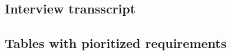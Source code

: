 \documentclass[paper=a4, fontsize=11pt,twoside]{scrartcl}	%
\begin{document}
\subsection{Interview transscript}


\subsection{Tables with pioritized requirements}




\end{document}
